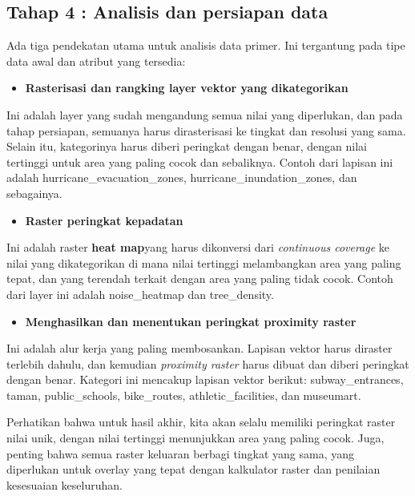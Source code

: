 \documentclass[]{book}
\providecommand{\tightlist}{%
  \setlength{\itemsep}{0pt}\setlength{\parskip}{0pt}}
\begin{document}
\hypertarget{tahap-4-analisis-dan-persiapan-data}{%
\subsection{Tahap 4 : Analisis dan persiapan data}\label{tahap-4-analisis-dan-persiapan-data}}

Ada tiga pendekatan utama untuk analisis data primer. Ini tergantung pada tipe data awal dan atribut yang tersedia:

\begin{itemize}
\tightlist
\item
  \textbf{Rasterisasi dan rangking layer vektor yang dikategorikan}
\end{itemize}

Ini adalah layer yang sudah mengandung semua nilai yang diperlukan, dan pada tahap persiapan, semuanya harus dirasterisasi ke tingkat dan resolusi yang sama. Selain itu, kategorinya harus diberi peringkat dengan benar, dengan nilai tertinggi untuk area yang paling cocok dan sebaliknya. Contoh dari lapisan ini adalah hurricane\_evacuation\_zones, hurricane\_inundation\_zones, dan sebagainya.

\begin{itemize}
\tightlist
\item
  \textbf{Raster peringkat kepadatan}
\end{itemize}

Ini adalah raster \textbf{heat map}yang harus dikonversi dari \emph{continuous coverage} ke nilai yang dikategorikan di mana nilai tertinggi melambangkan area yang paling tepat, dan yang terendah terkait dengan area yang paling tidak cocok. Contoh dari layer ini adalah noise\_heatmap dan tree\_density.

\begin{itemize}
\tightlist
\item
  \textbf{Menghasilkan dan menentukan peringkat proximity raster}
\end{itemize}

Ini adalah alur kerja yang paling membosankan. Lapisan vektor harus diraster terlebih dahulu, dan kemudian \emph{proximity raster} harus dibuat dan diberi peringkat dengan benar. Kategori ini mencakup lapisan vektor berikut: subway\_entrances, taman, public\_schools, bike\_routes, athletic\_facilities, dan museumart.

Perhatikan bahwa untuk hasil akhir, kita akan selalu memiliki peringkat raster nilai unik, dengan nilai tertinggi menunjukkan area yang paling cocok. Juga, penting bahwa semua raster keluaran berbagi tingkat yang sama, yang diperlukan untuk overlay yang tepat dengan kalkulator raster dan penilaian kesesuaian keseluruhan.
\end{document}
